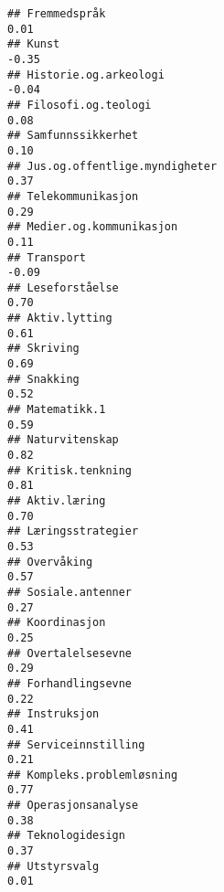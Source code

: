 \documentclass[
]{article}
\begin{document}
\begin{verbatim}
## Fremmedspråk                                                                      0.01
## Kunst                                                                            -0.35
## Historie.og.arkeologi                                                            -0.04
## Filosofi.og.teologi                                                               0.08
## Samfunnssikkerhet                                                                 0.10
## Jus.og.offentlige.myndigheter                                                     0.37
## Telekommunikasjon                                                                 0.29
## Medier.og.kommunikasjon                                                           0.11
## Transport                                                                        -0.09
## Leseforståelse                                                                    0.70
## Aktiv.lytting                                                                     0.61
## Skriving                                                                          0.69
## Snakking                                                                          0.52
## Matematikk.1                                                                      0.59
## Naturvitenskap                                                                    0.82
## Kritisk.tenkning                                                                  0.81
## Aktiv.læring                                                                      0.70
## Læringsstrategier                                                                 0.53
## Overvåking                                                                        0.57
## Sosiale.antenner                                                                  0.27
## Koordinasjon                                                                      0.25
## Overtalelsesevne                                                                  0.29
## Forhandlingsevne                                                                  0.22
## Instruksjon                                                                       0.41
## Serviceinnstilling                                                                0.21
## Kompleks.problemløsning                                                           0.77
## Operasjonsanalyse                                                                 0.38
## Teknologidesign                                                                   0.37
## Utstyrsvalg                                                                       0.01

\end{verbatim}
\end{document}
